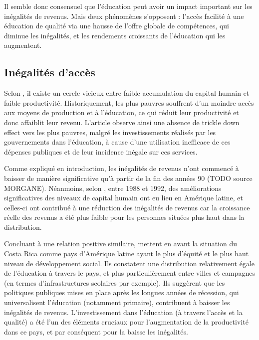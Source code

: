 \documentclass[pagesize, twoside=off, bibliography=totoc, DIV=calc, fontsize=12pt, a4paper, french]{scrartcl}
\begin{document}
Il semble donc consensuel que l’éducation peut avoir un impact important sur les inégalités de revenus. Mais deux phénomènes s’opposent : l’accès facilité à une éducation de qualité via une hausse de l’offre globale de compétences, qui diminue les inégalités, et les rendements croissants de l’éducation qui les augmentent.

\subsection{Inégalités d’accès}

Selon \citet{birdsall}, il existe un cercle vicieux entre faible accumulation du capital humain et faible productivité. Historiquement, les plus pauvres souffrent d’un moindre accès aux moyens de production et à l'éducation, ce qui réduit leur productivité et donc affaiblit leur revenu. L’article observe ainsi une absence de \og{}trickle down effect\fg{} vers les plus pauvres, malgré les investissements réalisés par les gouvernements dans l’éducation, à cause d’une utilisation inefficace de ces dépenses publiques et de leur incidence inégale sur ces services.

Comme expliqué en introduction, les inégalités de revenus n’ont commencé à baisser de manière significative qu’à partir de la fin des années 90 (TODO source MORGANE). Néanmoins, selon \citet{arabsheibani_changes_2006}, entre 1988 et 1992, des améliorations significatives des niveaux de capital humain ont eu lieu en Amérique latine, et celles-ci ont contribué à une réduction des inégalités de revenus car  la croissance réelle des revenus a été plus faible pour les personnes situées plus haut dans la distribution.

Concluant à une relation positive similaire, \citet{trejos_inequality_2004} mettent en avant la situation du Costa Rica comme pays d’Amérique latine ayant le plus d’équité et le plus haut niveau de développement social. Ils constatent une distribution relativement égale de l’éducation à travers le pays, et plus particulièrement entre villes et campagnes (en termes d’infrastructures scolaires par exemple). Ils suggèrent que les politiques publiques mises en place après les longues années de récession, qui universalisent l’éducation (notamment primaire), contribuent à baisser les inégalités de revenus. L’investissement dans l’éducation (à travers l’accès et la qualité) a été l’un des éléments cruciaux pour l’augmentation de la productivité dans ce pays, et par conséquent  pour la baisse les inégalités. 
\end{document}
